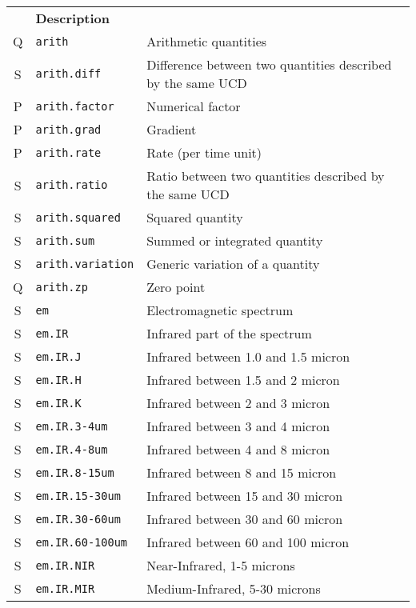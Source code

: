 \documentclass[11pt,a4paper]{ivoa}
\begin{document}
\footnotesize\begin{longtable}[h!]{c|p{40ex}|p{}}
\sptablerule
\multicolumn{2}{l|}{\textbf{UCD word}}&\textbf{Description}\\
\sptablerule
Q & {\tt arith} & Arithmetic quantities\\
S & {\tt arith.diff} & Difference between two quantities described by the same UCD\\
P & {\tt arith.factor} & Numerical factor\\
P & {\tt arith.grad} & Gradient\\
P & {\tt arith.rate} & Rate (per time unit)\\
S & {\tt arith.ratio} & Ratio between two quantities described by the same UCD\\
S & {\tt arith.squared} & Squared quantity\\
S & {\tt arith.sum} & Summed or integrated quantity\\
S & {\tt arith.variation} & Generic variation of a quantity\\
Q & {\tt arith.zp} & Zero point\\
S & {\tt em} & Electromagnetic spectrum\\
S & {\tt em.IR} & Infrared part of the spectrum\\
S & {\tt em.IR.J} & Infrared between 1.0 and 1.5 micron\\
S & {\tt em.IR.H} & Infrared between 1.5 and 2 micron\\
S & {\tt em.IR.K} & Infrared between 2 and 3 micron\\
S & {\tt em.IR.3-4um} & Infrared between 3 and 4 micron\\
S & {\tt em.IR.4-8um} & Infrared between 4 and 8 micron\\
S & {\tt em.IR.8-15um} & Infrared between 8 and 15 micron\\
S & {\tt em.IR.15-30um} & Infrared between 15 and 30 micron\\
S & {\tt em.IR.30-60um} & Infrared between 30 and 60 micron\\
S & {\tt em.IR.60-100um} & Infrared between 60 and 100 micron\\
S & {\tt em.IR.NIR} & Near-Infrared, 1-5 microns\\
S & {\tt em.IR.MIR} & Medium-Infrared, 5-30 microns\\

\end{longtable}
\end{document}
